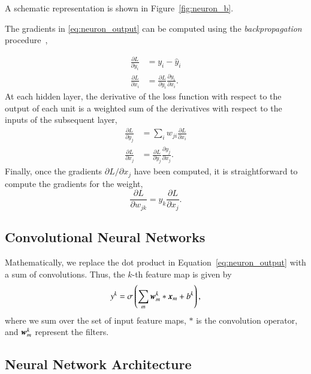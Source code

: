 \documentclass[fleqn,usenatbib]{mnras}
\begin{document}
A schematic representation is shown in Figure~\ref{fig:neuron_b}.

The gradients in \ref{eq:neuron_output} can be computed using the
\textit{backpropagation} procedure~\citep{rumelhart1988learning},

\begin{align}
  \frac{ \partial L }{ \partial y_i } &= y_i - \hat{y}_i \\
  \frac{ \partial L }{ \partial x_i } &=
    \frac{ \partial L }{ \partial y_i }
    \frac{ \partial y_i }{ \partial x_i }.
\end{align}
At each hidden layer, the derivative of the loss function with respect to the
output of each unit is a weighted sum of the derivatives with respect to the
inputs of the subsequent layer,
\begin{align}
  \frac{ \partial L }{ \partial y_j } &=
    \sum_{i} w_{ji} \frac{ \partial L }{ \partial x_i}   \\
  \frac{ \partial L }{ \partial x_j } &=
    \frac{ \partial L }{ \partial y_j }
    \frac{ \partial y_j }{ \partial x_j }.
\end{align}
Finally, once the gradients $\partial L / \partial x_j$ have been
computed, it is straightforward to compute the gradients for the weight,
\begin{equation}
\frac{\partial L}{\partial w_{jk}} = y_k \frac{\partial L}{\partial x_j}.
\end{equation}

\subsection{Convolutional Neural Networks}
  \label{sec:convnet}

Mathematically, we replace the dot product in Equation~\ref{eq:neuron_output}
with a sum of convolutions. Thus, the $k$-th feature map is given by
\begin{equation}
  y^k = \sigma \left( \sum_{m} \bmath{w}_m^k \ast \bmath{x}_m + b^k \right),
\end{equation}
where we sum over the set of input feature maps,
$\ast$ is the convolution operator, and $\bmath{w}_m^k$ represent the filters.


\subsection{Neural Network Architecture}
\end{document}
